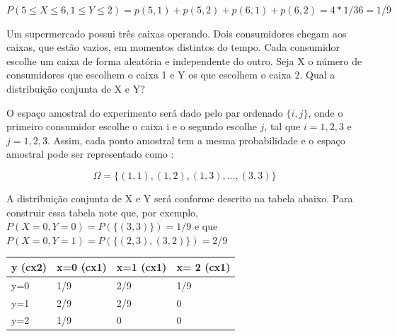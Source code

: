 \documentclass[
  letterpaper,
  DIV=11,
  numbers=noendperiod]{scrreprt}
\begin{document}
\begin{tcolorbox}[enhanced jigsaw, bottomrule=.15mm, colbacktitle=quarto-callout-caution-color!10!white, colback=white, toptitle=1mm, colframe=quarto-callout-caution-color-frame, breakable, arc=.35mm, opacitybacktitle=0.6, titlerule=0mm, title={RESPOSTA}, left=2mm, bottomtitle=1mm, coltitle=black, rightrule=.15mm, leftrule=.75mm, toprule=.15mm, opacityback=0]

\(P(5\leq X \leq 6, 1 \leq Y \leq 2)= p(5,1)+p(5,2) + p(6,1)+p(6,2) = 4 * 1/36= 1/9\)

\end{tcolorbox}

\begin{tcolorbox}[enhanced jigsaw, bottomrule=.15mm, colbacktitle=quarto-callout-tip-color!10!white, colback=white, toptitle=1mm, colframe=quarto-callout-tip-color-frame, breakable, arc=.35mm, opacitybacktitle=0.6, titlerule=0mm, title={EXEMPLO}, left=2mm, bottomtitle=1mm, coltitle=black, rightrule=.15mm, leftrule=.75mm, toprule=.15mm, opacityback=0]

Um supermercado possui três caixas operando. Dois consumidores chegam
aos caixas, que estão vazios, em momentos distintos do tempo. Cada
consumidor escolhe um caixa de forma aleatória e independente do outro.
Seja X o número de consumidores que escolhem o caixa 1 e Y os que
escolhem o caixa 2. Qual a distribuição conjunta de X e Y?

\end{tcolorbox}

\begin{tcolorbox}[enhanced jigsaw, bottomrule=.15mm, colbacktitle=quarto-callout-caution-color!10!white, colback=white, toptitle=1mm, colframe=quarto-callout-caution-color-frame, breakable, arc=.35mm, opacitybacktitle=0.6, titlerule=0mm, title={RESPOSTA}, left=2mm, bottomtitle=1mm, coltitle=black, rightrule=.15mm, leftrule=.75mm, toprule=.15mm, opacityback=0]

O espaço amostral do experimento será dado pelo par ordenado
\(\{ i,j \}\), onde o primeiro consumidor escolhe o caixa i e o segundo
escolhe \(j\), tal que \(i=1,2,3\) e \(j=1,2,3\). Assim, cada ponto
amostral tem a mesma probabilidade e o espaço amostral pode ser
representado como :

\[\Omega = { \{(1,1),(1,2),(1,3),...,(3,3)\} } \]

A distribuição conjunta de X e Y será conforme descrito na tabela
abaixo. Para construir essa tabela note que, por exemplo,
\(P(X=0,Y=0)=P(\{(3,3)\})=1/9\) e que
\(P(X=0,Y=1)=P(\{(2,3),(3,2)\})=2/9\)

\begin{longtable}[]{@{}llll@{}}
\toprule\noalign{}
y (cx2) & x=0 (cx1) & x=1 (cx1) & x= 2 (cx1) \\
\midrule\noalign{}
\endhead
\bottomrule\noalign{}
\endlastfoot
y=0 & 1/9 & 2/9 & 1/9 \\
y=1 & 2/9 & 2/9 & 0 \\
y=2 & 1/9 & 0 & 0 \\
\end{longtable}

\end{tcolorbox}
\end{document}
